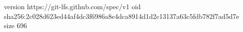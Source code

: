 version https://git-lfs.github.com/spec/v1
oid sha256:2c028d623ed44af4dc3f6986a8e4dca8914d1d2c13137a63c5fdb782f7ad5d7e
size 696
